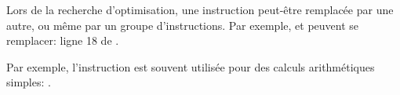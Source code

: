 Lors de la recherche d'optimisation, une instruction peut-être remplacée par une
autre, ou même par un groupe d'instructions.
Par exemple, \ADD et \SUB peuvent se remplacer:
ligne 18 de .

Par exemple, l'instruction \LEA est souvent utilisée pour des calculs arithmétiques
simples: .




